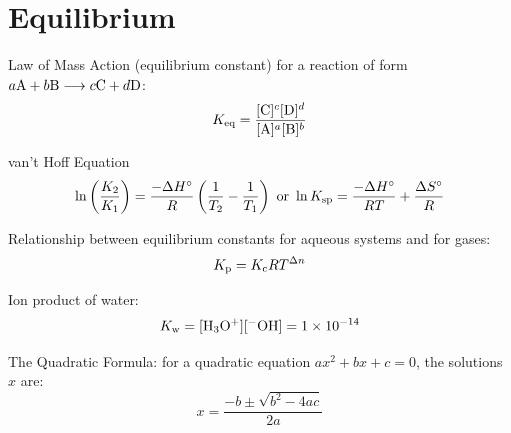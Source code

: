 \documentclass[10pt]{article}
\begin{document}

\newpage
\section{Equilibrium}


Law of Mass Action (equilibrium constant) for a reaction of form $a\textnormal{A}+b\textnormal{B} \longrightarrow c\textnormal{C}+d\textnormal{D}$:
\begin{equation*}
K_\textnormal{eq} = \frac{[\textnormal{C}]^c[\textnormal{D}]^d}{[\textnormal{A}]^a[\textnormal{B}]^b}
\end{equation*}

van't Hoff Equation
\begin{equation*}
\ln \left(\frac{K_2}{K_1}\right) = \frac{-\Delta H^\circ}{R}\left(\frac{1}{T_2}-\frac{1}{T_1}\right) \textnormal{ or } \ln K_\textnormal{sp} = \frac{-\Delta H^{\circ}}{RT} + \frac{\Delta S^{\circ}}{R}
\end{equation*}

Relationship between equilibrium constants for aqueous systems and for gases:
\begin{equation*}
K_\textnormal{p} = K_\textnormal{c}RT^{\Delta n}
\end{equation*}

Ion product of water:
\begin{equation*}
K_\textnormal{w} = [\textnormal{H$_3$O$^{+}$}][\textnormal{$^{-}$OH}] = \num{1e-14}
\end{equation*}

The Quadratic Formula: for a quadratic equation $ax^2+bx+c=0$, the solutions $x$ are:
\begin{equation*}
x = \frac{-b\pm\sqrt{b^2-4ac}}{2a}
\end{equation*}

\end{document}
